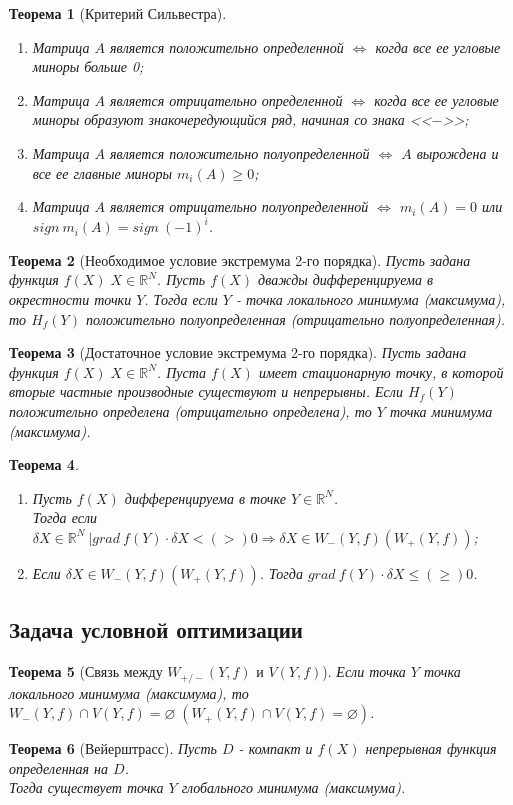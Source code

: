 \documentclass[12pt]{article}
\newtheorem{theorem}{Теорема}[section]
\theoremstyle{definition}
\theoremstyle{remark}
\begin{document}
\begin{theorem}[Критерий Сильвестра]
  \item
\begin{enumerate}
  \item Матрица $A$ является положительно определенной $\iff$ когда все ее угловые миноры больше 0;
  \item Матрица $A$ является отрицательно определенной $\iff$ когда все ее угловые миноры образуют знакочередующийся ряд, начиная со знака <<$-$>>;
  \item Матрица $A$ является положительно полуопределенной $\iff$ $A$ вырождена и все ее главные миноры $m_i(A)\geqslant 0$;
  \item Матрица $A$ является отрицательно полуопределенной $\iff$ $m_i(A)=0$ или $sign\:m_i(A)=sign\:(-1)^i$.
\end{enumerate}
\end{theorem}
\begin{theorem}[Необходимое условие экстремума 2-го порядка]
Пусть задана функция $f(X)\;X\in\mathbb{R}^N$. Пусть  $f(X)$ дважды дифференцируема в окрестности точки $Y$. Тогда если $Y$ - точка локального минимума (максимума), то $H_f(Y)$ положительно полуопределенная (отрицательно полуопределенная).
\end{theorem}
\begin{theorem}[Достаточное условие экстремума 2-го порядка]
Пусть задана функция $f(X)\;X\in\mathbb{R}^N$. Пуста $f(X)$ имеет стационарную точку, в которой вторые частные производные существуют и непрерывны. Если $H_f(Y)$ положительно определена (отрицательно определена), то $Y$ точка минимума (максимума).
\end{theorem}
\begin{theorem}
  \item
  \begin{enumerate}
    \item Пусть $f(X)$ дифференцируема в точке $Y\in\mathbb{R}^N$. \\Тогда если $\delta X\in\mathbb{R}^N \:\big| grad\:f(Y)\cdot \delta X <(>)0
  \Rightarrow \delta X \in W_-(Y,f)(W_+(Y,f))$;
  \item Если $\delta X \in W_-(Y,f)(W_+(Y,f))$. Тогда  $grad\:f(Y)\cdot \delta X \leqslant(\geqslant)0$.
  \end{enumerate}
\end{theorem}
\subsection{Задача условной оптимизации}
\begin{theorem}[Связь между $W_{+/-}(Y,f)$ и $V(Y,f)$]
Если точка $Y$ точка локального минимума (максимума), то $W_-(Y,f)\cap V(Y,f)= \varnothing \;(W_+(Y,f)\cap V(Y,f)= \varnothing) $.
\end{theorem}
\begin{theorem}[Вейерштрасс]
  Пусть $D$ - компакт и $f(X)$ непрерывная функция определенная на $D$.\\
  Тогда существует точка $Y$ глобального минимума (максимума).
\end{theorem}
\end{document}
